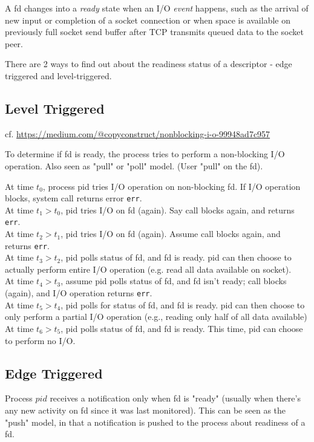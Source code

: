 \documentclass[10pt]{amsart}
\begin{document}
\begin{multicols*}{2}
A fd changes into a \emph{ready} state when an I/O \emph{event} happens, such as the arrival of new input or completion of a socket connection or when space is available on previously full socket send buffer after TCP transmits queued data to the socket peer.

There are 2 ways to find out about the readiness status of a descriptor - edge triggered and level-triggered.

\subsection{Level Triggered}

cf. \url{https://medium.com/@copyconstruct/nonblocking-i-o-99948ad7c957}

To determine if fd is ready, the process tries to perform a non-blocking I/O operation. Also seen as "pull" or "poll" model. (User "pull" on the fd).

At time $t_0$, process pid tries I/O operation on non-blocking fd. If I/O operation blocks, system call returns error \texttt{err}. \\
At time $t_1 > t_0$, pid tries I/O on fd (again). Say call blocks again, and returns \texttt{err}. \\
At time $t_2 > t_1$, pid tries I/O on fd (again). Assume call blocks again, and returns \texttt{err}. \\
At time $t_3 > t_2$, pid polls status of fd, and fd is ready. pid can then choose to actually perform entire I/O operation (e.g. read all data available on socket). \\
At time $t_4 > t_3$, assume pid polls status of fd, and fd isn't ready; call blocks (again), and I/O operation returns \texttt{err}. \\
At time $t_5 > t_4$, pid polls for status of fd, and fd is ready. pid can then choose to only perform a partial I/O operation (e.g., reading only half of all data available) \\
At time $t_6 > t_5$, pid polls status of fd, and fd is ready. This time, pid can choose to perform no I/O.

\subsection{Edge Triggered}

Process $pid$ receives a notification only when fd is "ready" (usually when there's any new activity on fd since it was last monitored). This can be seen as the "push" model, in that a notification is pushed to the process about readiness of a fd.


\end{multicols*}
\end{document}
